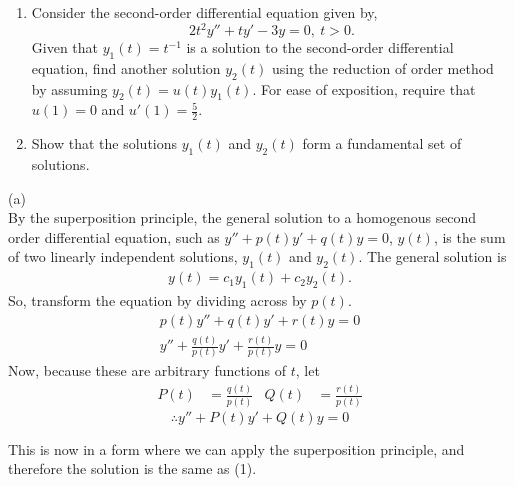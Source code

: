 \documentclass[a4paper, 11pt]{report}
\begin{document}
{\begin{enumerate}[label=(\alph*)]
    \item Consider the second-order differential equation given by,
      $$
        2t^2 y''+ty'-3y = 0,~t>0.
      $$
      Given that $y_1(t) = t^{-1}$ is a solution to the second-order differential equation, find another solution $y_2(t)$ using the reduction of order method by assuming $y_2(t) = u(t)y_1(t)$. For ease of exposition, require that $u(1) = 0$ and $u'(1) = \frac{5}{2}$.
    \item Show that the solutions $y_1(t)$ and $y_2(t)$ form a fundamental set of solutions.
  \end{enumerate}
}
\sol (a) \\
By the superposition principle, the general solution to a homogenous second order differential equation, such as $y'' + p(t)y' + q(t) y = 0$, $y(t)$, is the sum of two linearly independent solutions, $y_1(t)$ and $y_2(t)$. The general solution is
\begin{gather*}
  y(t) = c_1y_1(t) + c_2y_2(t). \tag*{(1)}
\end{gather*}
So, transform the equation by dividing across by $p(t)$.
\begin{gather*}
  p(t)y'' + q(t)y' + r(t)y = 0 \\
  y'' + \frac{q(t)}{p(t)}y' + \frac{r(t)}{p(t)} y = 0
\end{gather*}
Now, because these are arbitrary functions of $t$, let 
\begin{align*}
  P(t) &= \frac{q(t)}{p(t)} & Q(t) &= \frac{r(t)}{p(t)}
\end{align*}
$$
\therefore y'' + P(t)y' + Q(t)y = 0
$$

This is now in a form where we can apply the superposition principle, and therefore the solution is the same as (1). \\
\end{document}
